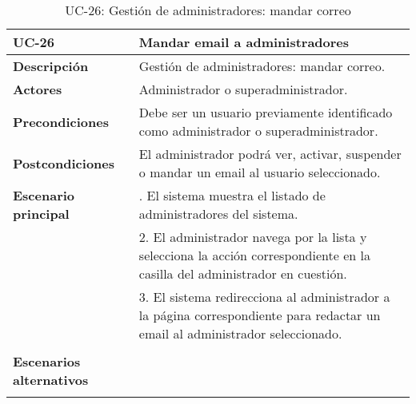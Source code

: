 \begin{table}[H]
  \begin{center}
    \begin{tabularx}{16.4cm}{|l|X|}
      \hline
      \textbf{UC-26} & \textbf{Mandar email a administradores}\\
      \hline
      \textbf{Descripción} & Gestión de administradores: mandar correo. \\
      \hline
      \textbf{Actores} & Administrador o superadministrador.\\
      \hline
      \textbf{Precondiciones} & Debe ser un usuario previamente identificado como administrador o superadministrador.\\
      \hline
      \textbf{Postcondiciones} & El administrador podrá ver, activar, suspender o mandar un email al usuario seleccionado.\\
      \hline
      \textbf{Escenario principal} & \smallskip 1. El sistema muestra el listado de administradores del sistema.\\
      & 2. El administrador navega por la lista y selecciona la acción correspondiente en la casilla del administrador en cuestión.\\
      & 3. El sistema redirecciona al administrador a la página correspondiente para redactar un email al administrador seleccionado.\\
      & \\
      \hline
      \textbf{Escenarios alternativos} & \\
      & \\
      \hline
    \end{tabularx}
    \caption{UC-26: Gestión de administradores: mandar correo}
  \end{center}
\end{table}



